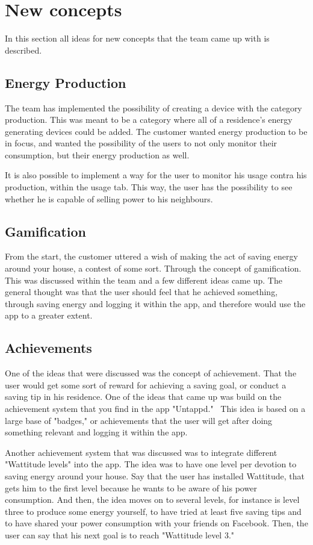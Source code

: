 \section{New concepts}
In this section all ideas for new concepts that the team came up with is described. 

\subsection{Energy Production}
The team has implemented the possibility of creating a device with the category production. This was meant to be a category where all of a residence's energy generating devices could be added. The customer wanted energy production to be in focus, and wanted the possibility of the users to not only monitor their consumption, but their energy production as well. 

It is also possible to implement a way for the user to monitor his usage contra his production, within the usage tab. This way, the user has the possibility to see whether he is capable of selling power to his neighbours. 

\subsection{Gamification}
From the start, the customer uttered a wish of making the act of saving energy around your house, a contest of some sort. Through the concept of gamification. This was discussed within the team and a few different ideas came up. The general thought was that the user should feel that he achieved something, through saving energy and logging it within the app, and therefore would use the app to a greater extent. 

\subsection{Achievements}
One of the ideas that were discussed was the concept of achievement. That the user would get some sort of reward for achieving a saving goal, or conduct a saving tip in his residence. One of the ideas that came up was build on the achievement system that you find in the app "Untappd."~\cite{untappd}
This idea is based on a large base of "badges," or achievements that the user will get after doing something relevant and logging it within the app. 

Another achievement system that was discussed was to integrate different "Wattitude levels" into the app. The idea was to have one level per devotion to saving energy around your house. Say that the user has installed Wattitude, that gets him to the first level because he wants to be aware of his power consumption. And then, the idea moves on to several levels, for instance is level three to produce some energy yourself, to have tried at least five saving tips and to have shared your power consumption with your friends on Facebook. Then, the user can say that his next goal is to reach "Wattitude level 3."


